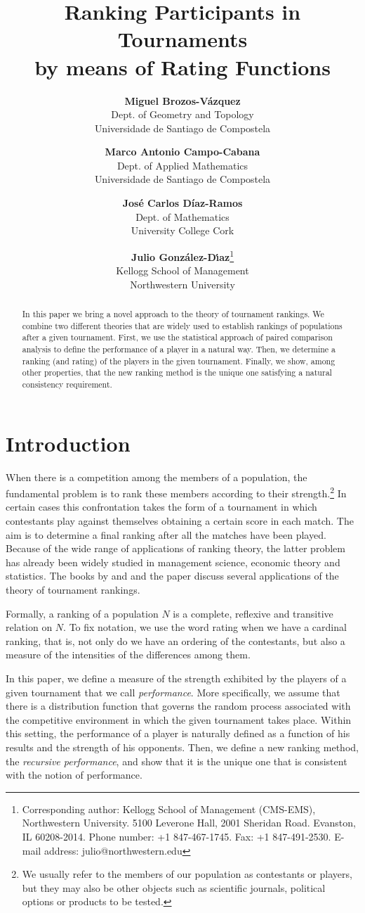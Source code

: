 \documentclass[a4paper,10pt]{article}
\author{\textbf{Miguel Brozos-V\'azquez} \\
{\small Dept. of Geometry and Topology} \\
{\small Universidade de Santiago de Compostela} \and
\textbf{Marco Antonio Campo-Cabana} \\
{\small Dept. of Applied Mathematics} \\
{\small Universidade de Santiago de Compostela} \and
\textbf{Jos\'e Carlos D\'iaz-Ramos} \\
{\small Dept. of Mathematics} \\
{\small University College Cork} \and
\textbf{Julio Gonz\'alez-D\'\i{}az}\footnote{Corresponding author:
Kellogg School of Management (CMS-EMS),
Northwestern University.
5100 Leverone Hall, 2001 Sheridan Road.
Evanston, IL 60208-2014.
Phone number: +1 847-467-1745.
Fax: +1 847-491-2530.
E-mail address: julio@northwestern.edu}\\
{\small Kellogg School of Management} \\
{\small Northwestern University} }
\title{Ranking Participants in Tournaments\\
 by means of Rating Functions}
\date{}
\theoremstyle{remark}
\begin{document}
\maketitle

\begin{abstract}
In this paper we bring a novel approach to the theory of
tournament rankings. We combine two different theories that are
widely used to establish rankings of populations after a given
tournament. First, we use the statistical approach of paired
comparison analysis to define the performance of a player in a
natural way. Then, we determine a ranking (and rating) of the
players in the given tournament. Finally, we show, among other properties, that the new ranking
method is the unique one satisfying a natural
consistency requirement.
\end{abstract}

\section{Introduction}\label{scIntro}

When there is a competition among the members of a population, the
fundamental problem is to rank these members according to their
strength.\footnote{We usually refer to the members of our
population as contestants or players, but they may also be other
objects such as scientific journals, political options or products to be tested.} In
certain cases this confrontation takes the form of a tournament in
which contestants play against themselves obtaining a certain
score in each match. The aim is to determine a final ranking after
all the matches have been played. Because of the wide range of
applications of ranking theory, the latter problem has already
been widely studied in management science, economic theory and
statistics. The books by \cite{Moon:1968} and \cite{Laslier:1997}
and the paper \cite{Iqbal:1986} discuss several applications of
the theory of tournament rankings.

Formally, a ranking of a population $N$ is a complete, reflexive
and transitive relation on $N$. To fix notation, we use the word
rating when we have a cardinal ranking, that is, not only do we
have an ordering of the contestants, but also a measure of the
intensities of the differences among them.

In this paper, we define a measure of the strength exhibited by
the players of a given tournament that we call \emph{performance}. More
specifically, we assume that there is a distribution function that
governs the random process associated with the competitive
environment in which the given tournament takes place. Within this
setting, the performance of a player is naturally defined as a
function of his results and the strength of his opponents.
Then, we define a new ranking method, the \emph{recursive
performance}, and show that it is the unique one that is consistent with the notion
of performance.
\end{document}
